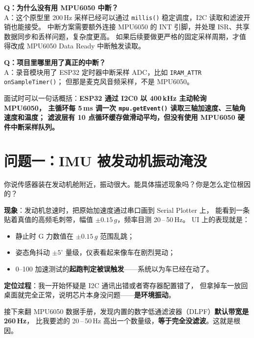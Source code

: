\documentclass[UTF8,11pt,a4paper]{ctexart}
\begin{document}
\begin{followup}
\medskip
\textbf{Q：为什么没有用 MPU6050 中断？}\\
A：这个原型里 200\,Hz 采样已经可以通过 \texttt{millis()} 稳定调度，I2C 读取和滤波开销也能接受。
中断方案需要额外连接 MPU6050 的 INT 引脚，并处理 ISR、共享数据同步和丢样问题，复杂度更高。
如果后续要做更严格的固定采样周期，才值得改成 MPU6050 Data Ready 中断触发读取。

\medskip
\textbf{Q：项目里哪里用了真正的中断？}\\
A：录音模块用了 ESP32 定时器中断采样 ADC，比如 \texttt{IRAM\_ATTR onSampleTimer()}；
但那是麦克风音频采样，不是 MPU6050。
\end{followup}

\begin{summary}
面试时可以一句话概括：\textbf{ESP32 通过 I2C0 以 400\,kHz 主动轮询 MPU6050，
主循环每 5\,ms 调一次 \texttt{mpu.getEvent()} 读取三轴加速度、三轴角速度和温度；
滤波层有 10 点循环缓存做滑动平均，但没有使用 MPU6050 硬件中断采样队列。}
\end{summary}

\section{问题一：IMU 被发动机振动淹没}

\begin{interviewer}
你说传感器装在发动机舱附近，振动很大。能具体描述现象吗？你是怎么定位根因的？
\end{interviewer}

\begin{candidate}
\textbf{现象}：发动机怠速时，把原始加速度通过串口画到 Serial Plotter 上，
能看到一条贴着真值的高频毛刺带，幅值 $\pm 0.15\,g$，频率目测 20\,–\,50\,Hz。
UI 上的表现就是：
\begin{itemize}[leftmargin=1.4em,topsep=2pt,itemsep=2pt]
  \item 静止时 G 力数值在 $\pm 0.15\,g$ 范围乱跳；
  \item 姿态角抖动 $\pm 5^\circ$ 量级，仪表看起来像车在剧烈晃动；
  \item 0--100 加速测试的\textbf{起跑判定被误触发}——系统以为车已经在动了。
\end{itemize}

\medskip
\textbf{定位过程}：我一开始怀疑是 I2C 通讯出错或者寄存器配置错了，
但拿掉车一放回桌面就完全正常，说明芯片本身没问题——\textbf{是环境振动}。

接下来翻 MPU6050 数据手册，发现内置的数字低通滤波器（DLPF）\textbf{默认带宽是 260\,Hz}，
比我要滤的 20\,–\,50\,Hz 高出一个数量级，\textbf{等于完全没滤波}。这就是根因。
\end{candidate}
\end{document}
